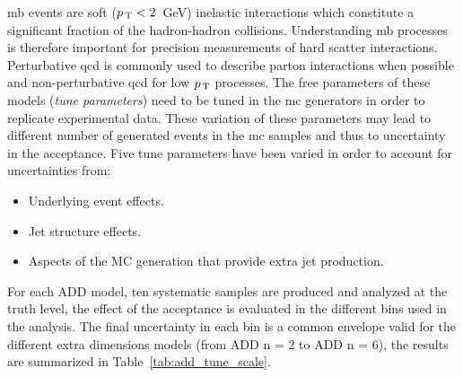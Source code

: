 \gls{mb} events are soft ($p_\mathrm{\, T} < 2$~GeV) inelastic interactions which constitute
a significant fraction of the hadron-hadron collisions. Understanding \gls{mb}
processes is therefore important for precision measurements of hard scatter
interactions. Perturbative \gls{qcd} is commonly used to describe parton
interactions when possible and non-perturbative \gls{qcd} for low $p_\mathrm{\, T}$
processes. The free parameters of these models (\emph{tune parameters}) need to
be tuned in the \gls{mc} generators in order to replicate experimental
data. These variation of these parameters may lead to different number of
generated events in the \gls{mc} samples and thus to uncertainty in the
acceptance. Five tune parameters have been varied in order to account for
uncertainties from:
\begin{itemize}
\item Underlying event effects.
\item Jet structure effects.
\item Aspects of the MC generation that provide extra jet production.
\end{itemize}
For each ADD model, ten systematic samples are produced and analyzed at the
truth level, the effect of the acceptance is evaluated in the different bins
used in the analysis. The final uncertainty in each bin is a common envelope
valid for the different extra dimensions models (from ADD n = 2 to ADD n = 6),
the results are summarized in Table~\ref{tab:add_tune_scale}.
\begin{table}[!ht]
  \centering
  \caption{Tune initial and final state radiation uncertainties in \% on the
    acceptance of the different signal region $\met$ bins in the analysis. The
    final value is a common envelope valid for all the ADD models between n = 2
    and n = 6 dimensions.}
  \label{tab:add_tune_scale}
\end{table}
